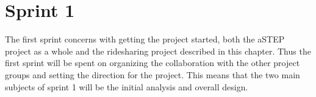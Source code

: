 \chapter{Sprint 1}
The first sprint concerns with getting the project started, both the aSTEP project as a whole and the ridesharing project described in this chapter.
Thus the first sprint will be spent on organizing the collaboration with the other project groups and setting the direction for the project.
This means that the two main subjects of sprint 1 will be the initial analysis and overall design.


%
%